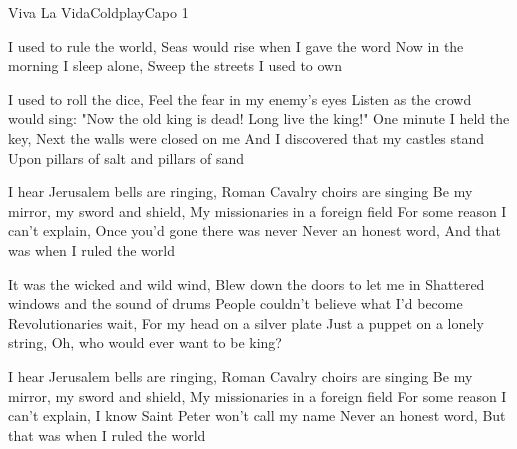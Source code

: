 \begin{song}{Viva La Vida}{Coldplay}{Capo 1}


I used to rule the world, Seas would rise when I gave the word
Now in the morning I sleep alone, Sweep the streets I used to own


I used to roll the dice, Feel the fear in my enemy's eyes
Listen as the crowd would sing:
"Now the old king is dead! Long live the king!"
One minute I held the key, Next the walls were closed on me
And I discovered that my castles stand
Upon pillars of salt and pillars of sand

I hear Jerusalem bells are ringing, Roman Cavalry choirs are singing
Be my mirror, my sword and shield, My missionaries in a foreign field
For some reason I can't explain, Once you'd gone there was never
Never an honest word, And that was when I ruled the world


It was the wicked and wild wind, Blew down the doors to let me in
Shattered windows and the sound of drums
People couldn't believe what I'd become
Revolutionaries wait, For my head on a silver plate
Just a puppet on a lonely string, Oh, who would ever want to be king?

I hear Jerusalem bells are ringing, Roman Cavalry choirs are singing
Be my mirror, my sword and shield, My missionaries in a foreign field
For some reason I can't explain, I know Saint Peter won't call my name
Never an honest word, But that was when I ruled the world


\end{song}
